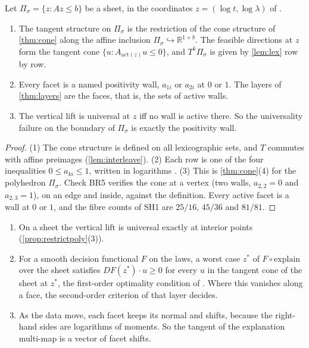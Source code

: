 \documentclass[11pt]{article}
\theoremstyle{definition}\newtheorem{definition}[theorem]{Definition}\newtheorem{remark}[theorem]{Remark}\newtheorem{example}[theorem]{Example}
\newcommand{\R}{\mathbb R}\newcommand{\X}{\mathbb X}\newcommand{\C}{\mathcal C}
\begin{document}
\begin{proposition}\label{prop:restrictpoly}
Let $\Pi_\sigma=\{z:Az\le b\}$ be a sheet, in the coordinates $z=(\log t,\log\lambda)$ of \cite[Theorem 5]{Covers}.
\begin{enumerate}
\item[(1)] The tangent structure on $\Pi_\sigma$ is the restriction of the cone structure of \cref{thm:cone} along the affine inclusion
  $\Pi_\sigma\hookrightarrow\R^{1+b}$. The feasible directions at $z$ form the tangent cone $\{u:A_{\mathrm{act}(z)}u\le0\}$, and
  $T^k\Pi_\sigma$ is given by \cref{lem:lex} row by row.
\item[(2)] Every facet is a named positivity wall, $a_{1i}$ or $a_{2i}$ at $0$ or $1$. The layers of \cref{thm:layers} are the faces,
  that is, the sets of active walls.
\item[(3)] The vertical lift is universal at $z$ iff no wall is active there. So the universality failure on the boundary of
  $\Pi_\sigma$ is exactly the positivity wall.
\end{enumerate}
\end{proposition}

\begin{proof}
(1) The cone structure is defined on all lexicographic sets, and $T$ commutes with affine preimages (\cref{lem:interleave}). (2) Each row is
one of the four inequalities $0\le a_{ki}\le1$, written in logarithms \cite[Theorem 5]{Covers}. (3) This is \cref{thm:cone}(4) for the
polyhedron $\Pi_\sigma$. Check BR5 verifies the cone at a vertex (two walls, $a_{2,2}=0$ and $a_{2,3}=1$), on an edge and inside, against
the definition. Every active facet is a wall at $0$ or $1$, and the fibre counts of SH1 are $25/16$, $45/36$ and $81/81$.
\end{proof}

\begin{proposition}\label{prop:sheet}
\begin{enumerate}
\item[(1)] On a sheet the vertical lift is universal exactly at interior points (\cref{prop:restrictpoly}(3)).
\item[(2)] For a smooth decision functional $F$ on the laws, a worst case $z^*$ of $F\circ\mathrm{explain}$ over the sheet satisfies
  $DF(z^*)\cdot u\ge0$ for every $u$ in the tangent cone of the sheet at $z^*$, the first-order optimality condition of
  \cite[Theorem 6.12]{RockafellarWets1998}. Where this vanishes along a face, the second-order criterion of that layer decides.
\item[(3)] As the data move, each facet keeps its normal and shifts, because the right-hand sides are logarithms of moments. So the
  tangent of the explanation multi-map is a vector of facet shifts.
\end{enumerate}
\end{proposition}
\end{document}
